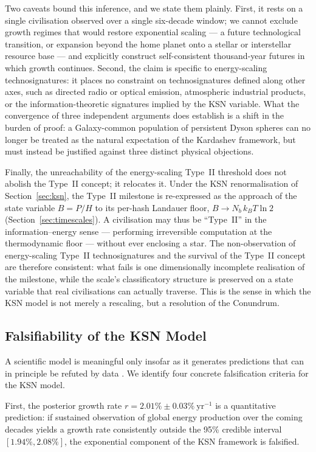 Two caveats bound this inference, and we state them plainly. First, it rests on a single
civilisation observed over a single six-decade window; we cannot exclude growth regimes
that would restore exponential scaling --- a future technological transition, or expansion
beyond the home planet onto a stellar or interstellar resource base --- and
\citet{HaqqMisra2025a} explicitly construct self-consistent thousand-year futures in
which growth continues. Second, the claim is specific to energy-scaling technosignatures:
it places no constraint on technosignatures defined along other axes, such as directed
radio or optical emission, atmospheric industrial products, or the information-theoretic
signatures implied by the KSN variable. What the convergence of three independent
arguments does establish is a shift in the burden of proof: a Galaxy-common population of
persistent Dyson spheres can no longer be treated as the natural expectation of the
Kardashev framework, but must instead be justified against three distinct physical
objections.

Finally, the unreachability of the energy-scaling Type~II threshold does not abolish the
Type~II concept; it relocates it. Under the KSN renormalisation of
Section~\ref{sec:ksn}, the Type~II milestone is re-expressed as the approach of the state
variable $B=P/H$ to its per-hash Landauer floor, $B\to N_b\,k_B T\ln 2$ (Section~\ref{sec:timescales}).
A civilisation may thus be ``Type~II'' in the information--energy sense --- performing
irreversible computation at the thermodynamic floor --- without ever enclosing a star.
The non-observation of energy-scaling Type~II technosignatures and the survival of the
Type~II concept are therefore consistent: what fails is one dimensionally incomplete
realisation of the milestone, while the scale's classificatory structure is preserved on
a state variable that real civilisations can actually traverse. This is the sense in
which the KSN model is not merely a rescaling, but a resolution of the Conundrum.

\subsection{Falsifiability of the KSN Model}
\label{sec:falsifiability}

A scientific model is meaningful only insofar as it generates predictions that can in
principle be refuted by data \citep{Blumer1987}. We identify four concrete falsification
criteria for the KSN model.

First, the posterior growth rate $r=2.01\%\pm0.03\%~\mathrm{yr^{-1}}$ is a quantitative
prediction: if sustained observation of global energy production over the coming decades
yields a growth rate consistently outside the 95\% credible interval $[1.94\%, 2.08\%]$,
the exponential component of the KSN framework is falsified.

